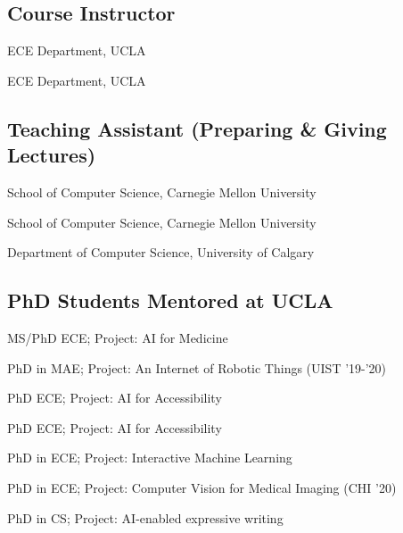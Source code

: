 \subsection{Course Instructor}

 {
	 {
		ECE Department, UCLA
	}
}

 {
	 {
		ECE Department, UCLA
	}
}

\subsection{Teaching Assistant (Preparing \& Giving Lectures)}

 {
	 {
		School of Computer Science, Carnegie Mellon University
	}
}

 {
	 {
		School of Computer Science, Carnegie Mellon University
	}
}

 {
	 {
		Department of Computer Science, University of Calgary
	}
}

\subsection{PhD Students Mentored at UCLA}

 {
	 {
		MS/PhD ECE; Project: AI for Medicine
	}
}

 {
	 {
		PhD in MAE; Project: An Internet of Robotic Things (UIST '19-'20)
	}
}

 {
	 {
		PhD ECE; Project: AI for Accessibility	}
}

 {
	 {
		PhD ECE; Project: AI for Accessibility	}
}

 {
	 {
		PhD in ECE; Project: Interactive Machine Learning
	}
}

 {
	 {
		PhD in ECE; Project: Computer Vision for Medical Imaging (CHI '20)	
	}
}

 {
	 {
		PhD in CS; Project: AI-enabled expressive writing	
	}
}

